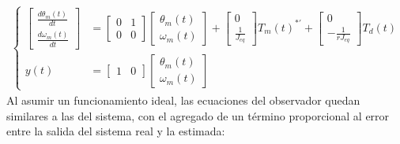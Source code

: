 \documentclass[a4paper, 10pt, onecolumn,journal]{ieeeconf}
\begin{document}
\begin{align}
	\begin{cases}
		\begin{bmatrix}
			\frac{d\theta_m(t)}{dt} \\ 
			\frac{d\omega_m(t)}{dt}
		\end{bmatrix} &= 
		\begin{bmatrix}
			0 & 1 \\ 
			0 & 0
		\end{bmatrix}
		\begin{bmatrix}
			{\theta}_m(t) \\ 
			{\omega}_m(t)
		\end{bmatrix} + 
		\begin{bmatrix}
			0 \\ 
			\frac{1}{J_{eq}}
		\end{bmatrix} {T_m(t)}^{*'} +
		\begin{bmatrix}
			0 \\ 
			-\frac{1}{r J_{eq}}
		\end{bmatrix} T_d(t)\\
		y(t) &= \begin{bmatrix}
			1 & 0
		\end{bmatrix} \begin{bmatrix}
		{\theta}_m(t) \\ 
		{\omega}_m(t)
		\end{bmatrix}
	\end{cases}\label{ecuacion matricial de subsistema mecanico compensado}
\end{align}
Al asumir un funcionamiento ideal, las ecuaciones del observador quedan similares a las del sistema, con el agregado de un término proporcional al error entre la salida del sistema real y la estimada:
\end{document}
